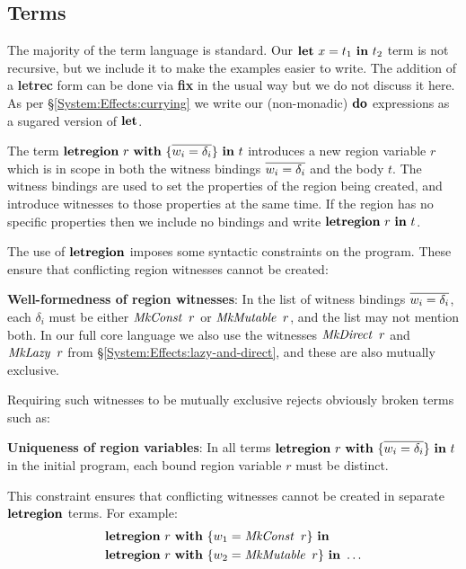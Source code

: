
\clearpage{}
\subsection{Terms}
\label{Core:Language:Terms}
The majority of the term language is standard. Our $\textrm{\textbf{let}} \ x = t_1 \ \textrm{\textbf{in}} \ t_2$ term is not recursive, but we include it to make the examples easier to write. The addition of a \textbf{letrec} form can be done via \textbf{fix} in the usual way \cite[\S11.11]{pierce:tapl} but we do not discuss it here. As per \S\ref{System:Effects:currying} we write our (non-monadic) $\textrm{\textbf{do}}$ expressions as a sugared version of $\textrm{\textbf{let}}$.

The term $\textrm{\textbf{letregion}} \ r \ \textrm{\textbf{with}} \ \{ \overline{w_i = \delta_i} \} \ \textrm{\textbf{in}} \ t$ introduces a new region variable $r$ which is in scope in both the witness bindings $\overline{w_i = \delta_i}$ and the body $t$. The witness bindings are used to set the properties of the region being created, and introduce witnesses to those properties at the same time. If the region has no specific properties then we include no bindings and write $\textrm{\textbf{letregion}} \ r \ \textrm{\textbf{in}} \ t$.

The use of $\textrm{\textbf{letregion}}$ imposes some syntactic constraints on the program. These ensure that conflicting region witnesses cannot be created:


\medskip
\textbf{Well-formedness of region witnesses}: In the list of witness bindings $\overline{w_i = \delta_i}$, each $\delta_i$ must be either $\operatorname{\mathit{MkConst}} \ r$ or $\operatorname{\mathit{MkMutable}} \ r$, and the list may not mention both. In our full core language we also use the witnesses $\operatorname{\mathit{MkDirect}} \ r$ and $\operatorname{\mathit{MkLazy}} \ r$ from \S\ref{System:Effects:lazy-and-direct}, and these are also mutually exclusive.

Requiring such witnesses to be mutually exclusive rejects obviously broken terms such as:



\textbf{Uniqueness of region variables}: In all terms $\textrm{\textbf{letregion}} \ r \ \textrm{\textbf{with}} \ \{ \overline{w_i = \delta_i} \} \ \textrm{\textbf{in}} \ t$ in the initial program, each bound region variable $r$ must be distinct. 

This constraint ensures that conflicting witnesses cannot be created in separate $\textrm{\textbf{letregion}}$ terms. For example:
$$
\begin{aligned}
& \rbletregion \ r \ \kwith \ \{ w_1 = \iMkConst \ r \} \ \rbin \\ 
& \rbletregion \ r \ \kwith \ \{ w_2 = \iMkMutable \ r \} \ \rbin \ \dots
\end{aligned}
$$

